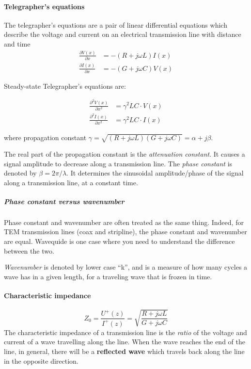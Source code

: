 \paragraph{Telegrapher's equations} The telegrapher's equations are a pair of linear differential equations which describe the voltage and current on an electrical transmission line with distance and time
\begin{align*}
  \frac{\partial V(x)}{\partial x} &= -(R+j\omega L)I(x) \\
  \frac{\partial I(x)}{\partial x} &= -(G+j\omega C)V(x)
\end{align*}

Steady-state Telegrapher's equations are:

\begin{align*}
  \frac{\partial ^2 V(x)}{\partial x^2} &= \gamma ^2 LC \cdot V(x) \\
  \frac{\partial ^2 I(x)}{\partial x^2} &= \gamma ^2 LC \cdot I(x)
\end{align*}

where propagation constant $\gamma = \sqrt{(R+j\omega L)(G+j\omega C)} = \alpha + j \beta$.

The real part of the propagation constant is the \emph{attenuation constant}. It causes a signal amplitude to decrease along a transmission line. The \emph{phase constant} is denoted by $\beta = 2\pi / \lambda$. It determines the sinusoidal amplitude/phase of the signal along a transmission line, at a constant time.

\subparagraph{Phase constant versus wavenumber} Phase constant and wavenumber are often treated as the same thing. Indeed, for TEM transmission lines (coax and stripline), the phase constant and wavenumber are equal. Wavequide is one case where you need to understand the difference between the two.

\emph{Wavenumber} is denoted by lower case ``k'', and is a measure of how many cycles a wave has in a given length, for a traveling wave that is frozen in time.

\paragraph{Characteristic impedance}
$$Z_0=\frac{U^+(z)}{I^+(z)}=\sqrt{\frac{R+j\omega L}{G+j\omega C}}$$
The characteristic impedance of a transmission line is the \emph{ratio} of the voltage and current of a wave travelling along the line. When the wave reaches the end of the line, in general, there will be a \textbf{reflected wave} which travels back along the line in the opposite direction.

